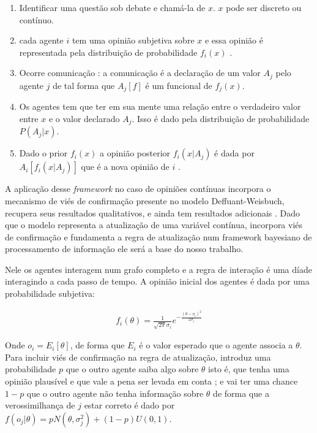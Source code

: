\begin{enumerate}
\item Identificar uma questão sob debate e chamá-la de $x$. \(x\) pode ser
  discreto ou contínuo.
\item cada agente \(i\) tem uma opinião subjetiva sobre $x$ e essa opinião é
  representada pela distribuição de probabilidade $f_i(x)$ .
\item Ocorre comunicação : a comunicação é a declaração de um valor
  $ A_j$ pelo agente $j$ de tal forma que $A_j[f]$ é um funcional de
  $f_j(x)$.
\item Os agentes tem que ter em sua mente  uma relação entre o
  verdadeiro valor entre $x$ e o valor declarado $A_j$. Isso é dado
  pela distribuição de probabilidade $P(A_j|x)$.
\item Dado o prior $f_i(x)$ a opinião posterior $f_i(x|A_j)$ é dada
  por $A_i[f_i(x|A_j)]$ que é a nova opinião de $i$ .
\end{enumerate}





A aplicação desse \textit{framework} no caso de opiniões contínuas incorpora o
mecanismo de viés de confirmação presente no modelo  Deffuant-Weisbuch,
recupera seus resultados qualitativos, e ainda tem resultados adicionais
\cite{martins2009bayesian}. Dado que o modelo representa a atualização de uma
variável contínua, incorpora viés de confirmação e fundamenta a regra de
atualização num framework bayesiano de processamento de informação ele será a base
do nosso trabalho. 

Nele os agentes interagem num grafo completo e a regra de interação é uma díade
interagindo a cada passo de tempo. A opinião inicial dos agentes é dada por uma
probabilidade subjetiva:


\begin{align}
f_i(\theta) = \frac{1}{\sqrt{2 \pi} \sigma_i} e^{-
  \frac{(\theta - o_i )^2}{2 \sigma_i}}
  \end{align}

  Onde \(o_i = E_i[\theta] \), de forma que \(E_i\) é o valor esperado que o agente
  associa a \(\theta\). Para incluir viés de confirmação na regra de atualização,
   introduz uma probabilidade \(p\) que o outro
  agente saiba algo sobre $\theta$ isto é, que tenha uma opinião plausível e que vale
  a pena ser levada em conta ; e vai ter uma chance \(1 - p\) que o outro agente
  não tenha informação sobre $\theta$ de forma que a verossimilhança de $j$ estar
  correto é dado por $ f(o_j|\theta) = p N(\theta,\sigma_j^2) + (1-p)U(0,1)$.

